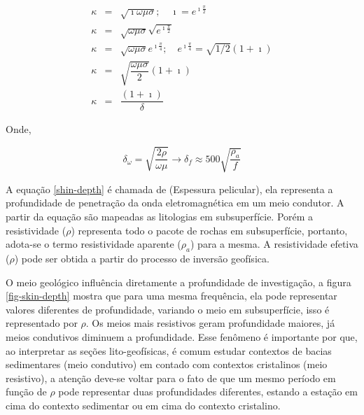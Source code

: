         {\setlength\arraycolsep{2pt}
        \begin{eqnarray}
            \kappa & = & \sqrt{\imath \omega \mu \sigma}; \quad \imath = e^{\imath \frac{\pi}{2}} \nonumber \\
            \kappa & = & \sqrt{\omega \mu \sigma} \sqrt{e^{\imath \frac{\pi}{2}}} \nonumber \\
            \kappa & = & \sqrt{\omega \mu \sigma} e^{\imath \frac{\pi}{4}}; \quad e^{\imath \frac{\pi}{4}} = \sqrt{1/2} (1 + \imath) \nonumber \\
            \kappa & = & \sqrt{\dfrac{\omega \mu \sigma}{2}} (1 + \imath) \nonumber \\
            \kappa & = & \dfrac{(1 + \imath)}{\delta}
        \end{eqnarray}} 
        
        \noindent Onde,
        
        \begin{equation}
            \label{shin-depth}
            \delta_\omega = \sqrt{\dfrac{2 \rho}{\omega \mu}} \longrightarrow \delta_f \approx 500  \sqrt{\frac{\rho_a}{f}}
        \end{equation}
        
        A equação \ref{shin-depth} é chamada de  (Espessura pelicular), ela representa a profundidade de penetração da onda eletromagnética em um meio condutor.
        A partir da equação são mapeadas as litologias em subsuperfície. Porém a resistividade ($\rho$) representa todo o pacote de rochas em subsuperfície, portanto, adota-se o termo resistividade aparente ($\rho_a$) para a mesma. A resistividade efetiva ($\rho$) pode ser obtida a partir do processo de inversão geofísica.        

        O meio geológico influência diretamente a profundidade de investigação, a figura \ref{fig-skin-depth} mostra que para uma mesma frequência, ela pode representar valores diferentes de profundidade, variando o meio em subsuperfície, isso é representado por $\rho$. Os meios mais resistivos geram profundidade maiores, já meios condutivos diminuem a profundidade. Esse fenômeno é importante por que, ao interpretar as seções lito-geofísicas, é comum estudar contextos de bacias sedimentares (meio condutivo) em contado com contextos cristalinos (meio resistivo), a atenção deve-se voltar para o fato de que um mesmo período em função de $\rho$ pode representar duas profundidades diferentes, estando a estação em cima do contexto sedimentar ou em cima do contexto cristalino. 
        
